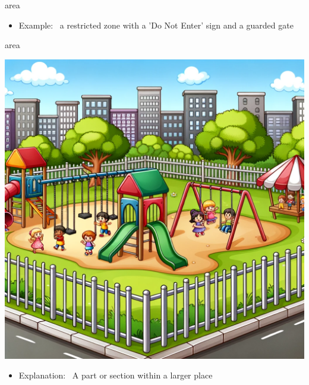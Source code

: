 \documentclass[avery5371, grid,frame]{flashcards}
\begin{document}
\begin{flashcard}{area}
\begin{center}
\begin{minipage}[c]{.45\textwidth}
\begin{itemize}
            \item Example: \ a restricted zone with a 'Do Not Enter' sign and a guarded gate
            \end{itemize}
        \end{minipage}
    \end{center}
    \vspace*{\fill}
\end{flashcard}\begin{flashcard}{area}
    \vspace*{\fill}
    \begin{center}
        \begin{minipage}[c]{.45\textwidth}
            \includegraphics[width=\textwidth]{cards/a/area/area - a fenced playground with swings, slides, and kids playing.png}
        \end{minipage}
        \begin{minipage}[c]{.45\textwidth}
            \begin{itemize}\setlength\itemsep{12pt}
            \item Explanation: \ A part or section within a larger place


\end{itemize}
\end{minipage}
\end{center}
\end{flashcard}
\end{document}

